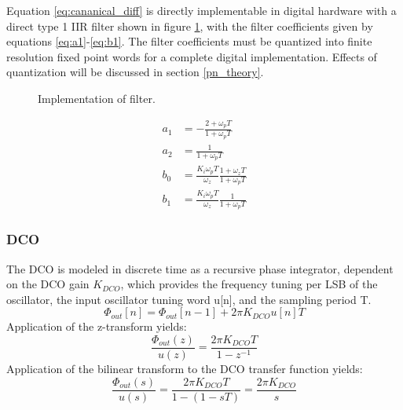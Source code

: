 Equation \ref{eq:cananical_diff} is directly implementable in digital hardware with a direct type 1 IIR filter shown in figure \ref{fig:filt_imple}, with the filter coefficients given by equations \ref{eq:a1}-\ref{eq:b1}. The filter coefficients must be quantized into finite resolution fixed point words for a complete digital implementation. Effects of quantization will be discussed in section \ref{pn_theory}.
\begin{figure}[htb!]
	\center
	\caption{Implementation of filter.}
	\label{fig:filt_imple}
\end{figure}
\begin{align}
	a_1 &= -\frac{2+\omega_pT}{1+\omega_pT}\label{eq:a1}\\
	a_2 &= \frac{1}{1+\omega_pT} \\
	b_0 &= \frac{K_i\omega_pT}{\omega_z}\frac{1+\omega_zT}{1+\omega_pT}\\
	b_1 &= \frac{K_i\omega_pT}{\omega_z}\frac{1}{1+\omega_pT}\label{eq:b1}
\end{align}
\subsubsection{DCO}
The DCO is modeled in discrete time as a recursive phase integrator, dependent on the DCO gain $K_{DCO}$, which provides the frequency tuning per LSB of the oscillator, the input oscillator tuning word u[n], and the sampling period T.
\begin{equation}
	\Phi_{out}[n] = \Phi_{out}[n-1] + 2\pi K_{DCO}u[n]T
\end{equation}
Application of the z-transform yields:
\begin{equation}
	\frac{\Phi_{out}(z)}{u(z)} = \frac{2\pi K_{DCO}T}{1-z^{-1}}
\end{equation}
Application of the bilinear transform to the DCO transfer function yields:
\begin{equation}
	\frac{\Phi_{out}(s)}{u(s)} = \frac{2\pi K_{DCO}T}{1-(1-sT)} = \frac{2\pi K_{DCO}}{s} 
\end{equation}
